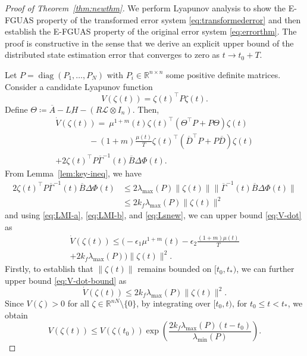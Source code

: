 \documentclass[journal]{IEEEtran}
\newcommand{\R}{\ensuremath{\mathbb{R}}}	%
\newcommand{\diag}{\operatorname{diag}}	%
\def\T{\top}
\begin{document}
\begin{proof}[Proof of Theorem~\ref{thm:newthm}]
We perform Lyapunov analysis to show the E-FGUAS property of the transformed error system \eqref{eq:transformederror} and then establish the E-FGUAS property of the original error system \eqref{eq:errorthm}. 
The proof is constructive in the sense that we derive an explicit upper bound of the distributed state estimation error that converges to zero as $t\to t_0+T$.

Let $P=\diag(P_1,\dots,P_N)$ with $P_i\in\mathbb R^{n\times n}$ some positive definite matrices. 
Consider a candidate Lyapunov function
    \begin{equation*}
        V(\zeta(t)) = \zeta(t)^{\T} P\zeta(t).
    \end{equation*}
Define $\Theta\coloneqq\overline{A}-\underline{LH}-(R\mathcal{L}\otimes I_n)$.
Then,
\begin{multline}
    \label{eq:V-dot}
    \dot V(\zeta(t)) =\ \mu^{1+m}(t) \zeta(t)^{\T} ( \Theta^{\T} {P} + {P} \Theta ) \zeta(t) \\
    \qquad\qquad - (1+m) \frac{{\mu(t)}}{T}\zeta(t)^{\T}( \overline{D}^{\T} {P}+P\overline{D}) \zeta(t) \\
    + 2 \zeta(t)^{\T} {P} \overline{\Gamma}^{-1}(t)\overline B\Delta\Phi(t).
\end{multline}
From Lemma~\ref{lem:key-ineq}, we have
\begin{align*}
        2 \zeta(t)^{\T} {P} \overline{\Gamma}^{-1}(t)\overline B \Delta \Phi(t) &\leq 2 \lambda_{\max}(P) \|\zeta(t)\| \|\overline{\Gamma}^{-1}(t)\overline B \Delta \Phi(t)\| \\
        &\leq 2k_f\lambda_{\max}(P) \| \zeta(t) \|^2
\end{align*}
and using \eqref{eq:LMI-a}, \eqref{eq:LMI-b}, and \eqref{eq:Lsnew}, we can upper bound \eqref{eq:V-dot} as
\begin{multline}
\label{eq:V-dot-bound}
    \dot V(\zeta(t)) \leq \bigg( -\epsilon_1 \mu^{1+m}(t) -\epsilon_2 \frac{(1+m)\mu(t)}{T} \\
    +2k_f \lambda_{\max}(P)\bigg) \|\zeta(t) \|^2.
\end{multline}
Firstly, to establish that $\|\zeta(t)\|$ remains bounded on $[t_0,t_\ast)$, we can further upper bound \eqref{eq:V-dot-bound} as
\[
\dot V(\zeta(t)) \leq 2k_f \lambda_{\max}(P)\|\zeta(t)\|^2.
\]
Since $V(\zeta) > 0$ for all $\zeta \in \R^{nN}  \setminus \{0\}$, by integrating over $[t_0,t)$, for $t_0\leq t < t_\ast$, we obtain
\begin{equation*}
V(\zeta(t)) \leq V(\zeta(t_0))\exp\left(\frac{2k_f \lambda_{\max}(P)(t-t_0)}{\lambda_{\min}(P)}\right).
\end{equation*}


\end{proof}
\end{document}
